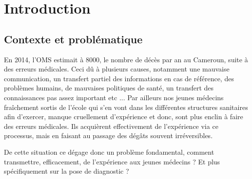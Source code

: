 
\chapter{Introduction}
\label{chp:intro}


\section{Contexte et problématique}

En 2014, l'OMS estimait à $8000$, le nombre de décès par an au Cameroun, suite à des erreurs médicales. Ceci dû à plusieurs causes, notamment une mauvaise communication, un transfert partiel des informations en cas de référence, des problèmes humains, de mauvaises politiques de santé, un transfert des connaissances pas assez important etc ...  Par ailleurs nos jeunes médecins fraîchement sortis de l'école qui s'en vont dans les différentes structures sanitaires afin d'exercer, manque cruellement d'expérience et donc, sont plus enclin à faire des erreurs médicales. Ils acquièrent effectivement de l'expérience via ce processus, mais en faisant au passage des dégâts souvent irréversibles.

De cette situation ce dégage donc un problème fondamental, comment transmettre, efficacement, de l'expérience aux jeunes médecins ? Et plus spécifiquement sur la pose de diagnostic ?


